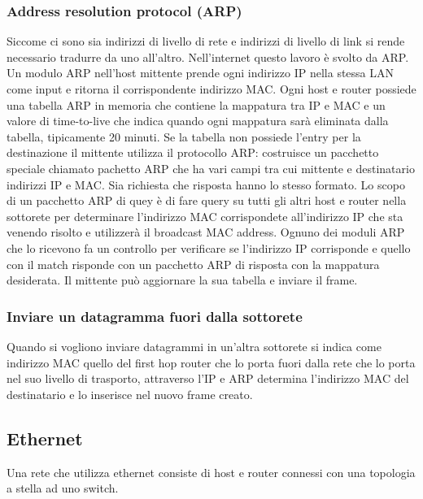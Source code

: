 \subsubsection{Address resolution protocol (ARP)}
Siccome ci sono sia indirizzi di livello di rete e indirizzi di livello di link si rende necessario tradurre da uno all'altro. Nell'internet questo lavoro \`e svolto da ARP. Un modulo ARP nell'host mittente prende ogni 
indirizzo IP nella stessa LAN come input e ritorna il corrispondente indirizzo MAC. Ogni host e router possiede una tabella ARP in memoria che contiene la mappatura tra IP e MAC e un valore di time-to-live che
indica quando ogni mappatura sar\`a eliminata dalla tabella, tipicamente 20 minuti. Se la tabella non possiede l'entry per la destinazione il mittente utilizza il protocollo ARP: costruisce un pacchetto speciale
chiamato pachetto ARP che ha vari campi tra cui mittente e destinatario indirizzi IP e MAC. Sia richiesta che risposta hanno lo stesso formato. Lo scopo di un pacchetto ARP di quey \`e di fare query su tutti gli 
altri host e router nella sottorete per determinare l'indirizzo MAC corrispondete all'indirizzo IP che sta venendo risolto e utilizzer\`a il broadcast MAC address. Ognuno dei moduli ARP che lo ricevono fa un 
controllo per verificare se l'indirizzo IP corrisponde e quello con il match risponde con un pacchetto ARP di risposta con la mappatura desiderata. Il mittente pu\`o aggiornare la sua tabella e inviare il frame. 
\subsubsection{Inviare un datagramma fuori dalla sottorete}
Quando si vogliono inviare datagrammi in un'altra sottorete si indica come indirizzo MAC quello del first hop router che lo porta fuori dalla rete che lo porta nel suo livello di trasporto, attraverso l'IP e ARP
determina l'indirizzo MAC del destinatario e lo inserisce nel nuovo frame creato. 
\subsection{Ethernet}
Una rete che utilizza ethernet consiste di host e router connessi con una topologia a stella ad uno switch. 
